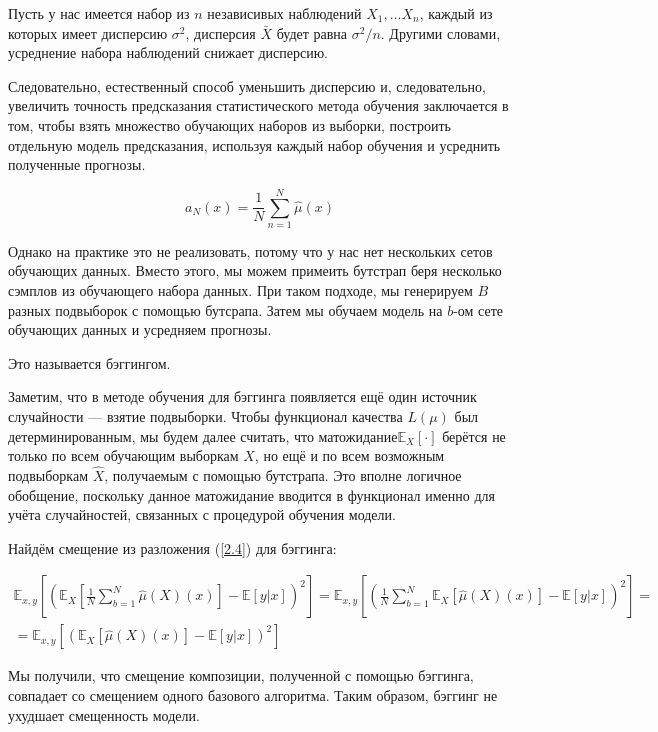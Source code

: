 \documentclass{article}
\theoremstyle{definition}
\theoremstyle{theorem}
\theoremstyle{remark}
\theoremstyle{theorem}
\theoremstyle{example}
\theoremstyle{theorem}
\theoremstyle{theorem}
\theoremstyle{theorem}
\theoremstyle{theorem}
\begin{document}
Пусть у нас имеется набор из $n$ независивых наблюдений $X_1,\ldots X_n$, каждый из которых имеет дисперсию $\sigma^2$, дисперсия $\bar{X}$ будет равна $\sigma^2/n$. Другими словами, усреднение набора наблюдений снижает дисперсию.

Следовательно, естественный способ уменьшить дисперсию и, следовательно, увеличить точность предсказания статистического метода обучения заключается в том, чтобы взять множество обучающих наборов из выборки, построить отдельную модель предсказания, используя каждый набор обучения и усреднить полученные прогнозы. 

\begin{equation}
	{a}_{N}(x) = \dfrac{1}{N}\sum_{n=1}^{N}\hat{\mu}(x)
\end{equation}

Однако на практике это не реализовать, потому что у нас нет нескольких сетов обучающих данных. Вместо этого, мы можем примеить бутстрап беря несколько сэмплов из обучающего набора данных. При таком подходе, мы генерируем $B$ разных подвыборок с помощью бутсрапа. Затем мы обучаем модель на $b$-ом сете обучающих данных и усредняем прогнозы.

Это называется бэггингом.

Заметим, что в методе обучения для бэггинга появляется ещё один источник случайности — взятие подвыборки. Чтобы функционал качества $L(\mu)$ был детерминированным, мы будем далее считать, что матожидание$ \mathbb{E}_X [\cdot]$ берётся не только по всем обучающим выборкам $ X$, но ещё и по всем возможным подвыборкам $\hat{X}$, получаемым с помощью бутстрапа. Это вполне логичное обобщение, поскольку данное матожидание вводится в функционал именно для учёта случайностей, связанных с процедурой обучения модели.

Найдём смещение из разложения (\ref{2.4}) для бэггинга:

\begin{multline}
	\mathbb{E}_{x,y}\left[\left(\mathbb{E}_X\left[\frac{1}{N}\sum_{b=1}^{N}\hat{\mu}(X)(x)\right]-\mathbb{E}[y|x]\right)^2\right] = \mathbb{E}_{x,y}\left[\left(\frac{1}{N}\sum_{b=1}^{N}\mathbb{E}_X[\hat{\mu}(X)(x)] - \mathbb{E}[y|x]\right)^2\right] = \\ =\mathbb{E}_{x,y}\left[(\mathbb{E}_X\left[\hat{\mu}(X)(x)\right]-\mathbb{E}[y|x])^2\right]
\end{multline}


Мы получили, что смещение композиции, полученной с помощью бэггинга, совпадает со смещением одного базового алгоритма. Таким образом, бэггинг не ухудшает смещенность модели.
\end{document}
